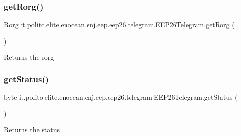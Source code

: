 \subsubsection{\texorpdfstring{get\+Rorg()}{getRorg()}}
{\footnotesize\ttfamily \hyperlink{classit_1_1polito_1_1elite_1_1enocean_1_1enj_1_1eep_1_1_rorg}{Rorg} it.\+polito.\+elite.\+enocean.\+enj.\+eep.\+eep26.\+telegram.\+E\+E\+P26\+Telegram.\+get\+Rorg (\begin{DoxyParamCaption}{ }\end{DoxyParamCaption})}

\begin{DoxyReturn}{Returns}
the rorg 
\end{DoxyReturn}
\hypertarget{classit_1_1polito_1_1elite_1_1enocean_1_1enj_1_1eep_1_1eep26_1_1telegram_1_1_e_e_p26_telegram_ab4fcccc90f182b24c70548164c6af1e2}{}\label{classit_1_1polito_1_1elite_1_1enocean_1_1enj_1_1eep_1_1eep26_1_1telegram_1_1_e_e_p26_telegram_ab4fcccc90f182b24c70548164c6af1e2} 
\subsubsection{\texorpdfstring{get\+Status()}{getStatus()}}
{\footnotesize\ttfamily byte it.\+polito.\+elite.\+enocean.\+enj.\+eep.\+eep26.\+telegram.\+E\+E\+P26\+Telegram.\+get\+Status (\begin{DoxyParamCaption}{ }\end{DoxyParamCaption})}

\begin{DoxyReturn}{Returns}
the status 
\end{DoxyReturn}
\hypertarget{classit_1_1polito_1_1elite_1_1enocean_1_1enj_1_1eep_1_1eep26_1_1telegram_1_1_e_e_p26_telegram_a20728fa96d1d8ba5316faa566c52583b}{}\label{classit_1_1polito_1_1elite_1_1enocean_1_1enj_1_1eep_1_1eep26_1_1telegram_1_1_e_e_p26_telegram_a20728fa96d1d8ba5316faa566c52583b} 
